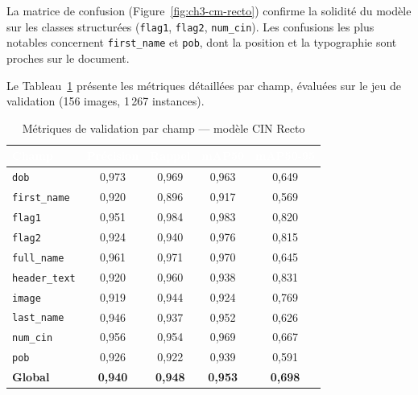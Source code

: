 La matrice de confusion (Figure~\ref{fig:ch3-cm-recto}) confirme la solidité du modèle sur les classes structurées (\texttt{flag1}, \texttt{flag2}, \texttt{num\_cin}). Les confusions les plus notables concernent \texttt{first\_name} et \texttt{pob}, dont la position et la typographie sont proches sur le document.

Le Tableau~\ref{tab:ch3-metrics-recto} présente les métriques détaillées par champ, évaluées sur le jeu de validation (156 images, 1\,267 instances).

\begin{table}[H]
  \centering
  \small
  \begin{tabular}{|l|c|c|c|c|}
    \toprule
    \rowcolor{bleu_principal}
    \textcolor{white}{\textbf{Champ}} & \textcolor{white}{\textbf{Précision}} & \textcolor{white}{\textbf{Rappel}} & \textcolor{white}{\textbf{mAP50}} & \textcolor{white}{\textbf{mAP50-95}} \\
    \midrule
    \texttt{dob}         & 0,973 & 0,969 & 0,963 & 0,649 \\
    \midrule
    \rowcolor{gris_leger}
    \texttt{first\_name} & 0,920 & 0,896 & 0,917 & 0,569 \\
    \midrule
    \texttt{flag1}       & 0,951 & 0,984 & 0,983 & 0,820 \\
    \midrule
    \rowcolor{gris_leger}
    \texttt{flag2}       & 0,924 & 0,940 & 0,976 & 0,815 \\
    \midrule
    \texttt{full\_name}  & 0,961 & 0,971 & 0,970 & 0,645 \\
    \midrule
    \rowcolor{gris_leger}
    \texttt{header\_text}& 0,920 & 0,960 & 0,938 & 0,831 \\
    \midrule
    \texttt{image}       & 0,919 & 0,944 & 0,924 & 0,769 \\
    \midrule
    \rowcolor{gris_leger}
    \texttt{last\_name}  & 0,946 & 0,937 & 0,952 & 0,626 \\
    \midrule
    \texttt{num\_cin}    & 0,956 & 0,954 & 0,969 & 0,667 \\
    \midrule
    \rowcolor{gris_leger}
    \texttt{pob}         & 0,926 & 0,922 & 0,939 & 0,591 \\
    \midrule
    \rowcolor{bleu_clair!15}
    \textbf{Global}      & \textbf{0,940} & \textbf{0,948} & \textbf{0,953} & \textbf{0,698} \\
    \bottomrule
  \end{tabular}
  \caption{Métriques de validation par champ --- modèle CIN Recto}
  \label{tab:ch3-metrics-recto}
\end{table}

